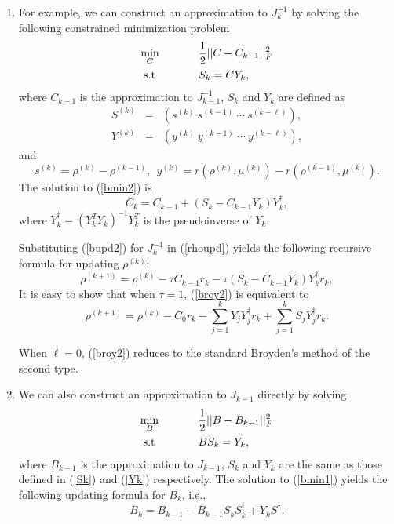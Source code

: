 \documentclass[11pt]{book}
\newcommand{\rhok}{\rho^{(k)}}
\begin{document}
\begin{enumerate}
\item For example, we can construct an approximation to $J_k^{-1}$ by solving 
the following constrained minimization problem
\begin{align}
\min_{C}  \hspace{.5in} &\frac{1}{2}||C - C_{k-1}||^2_F \nonumber \\
\text{s.t } \hspace{.5in} & S_k = CY_k, \label{bmin2}
\end{align}
where $C_{k-1}$ is the approximation to $J^{-1}_{k-1}$, $S_k$ and 
$Y_k$ are defined as 
\begin{eqnarray}
S^{(k)} &=& ( s^{(k)}\: s^{(k-1)} \: \cdots \: s^{(k-\ell)} ), \label{Sk}\\
Y^{(k)} &=& ( y^{(k)}\: y^{(k-1)} \: \cdots \: y^{(k-\ell)} ), \label{Yk}
\end{eqnarray}
and
\begin{equation}
s^{(k)} = \rho^{(k)} - \rho^{(k-1)}, \ \ 
y^{(k)} = r(\rho^{(k)},\mu^{(k)}) - r(\rho^{(k-1)},\mu^{(k)}). 
\label{syk}
\end{equation}
The solution to (\ref{bmin2}) is
\begin{equation}
C_k = C_{k-1} + (S_k-C_{k-1}Y_k)Y_k^{\dagger},
\label{bupd2}
\end{equation}
where $Y_k^{\dagger} = (Y_k^TY_k)^{-1}Y_k^T$ is the pseudoinverse of $Y_k$.

Substituting (\ref{bupd2}) for $J_{k}^{-1}$ in (\ref{rhoupd}) 
yields the following recursive formula for updating $\rhok$:
\begin{equation}
\rho^{(k+1)} = \rhok - \tau C_{k-1}r_k - \tau 
(S_k - C_{k-1}Y_k)Y_k^{\dagger}r_k,
\label{broy2}
\end{equation}
It is easy to show that when $\tau = 1$, (\ref{broy2}) is equivalent to
\[
\rho^{(k+1)} = \rhok
- C_0 r_k - \sum_{j = 1}^k Y_jY_j^{\dagger} r_k + \sum_{j=1}^k S_j Y_j^{\dagger} r_k.
\]

When $\ell=0$, (\ref{broy2}) reduces to the standard Broyden's method of the 
second type. 


\item
We can also construct an approximation to $J_{k-1}$ directly by solving 
\begin{align}
\min_{B}  \hspace{.5in} &\frac{1}{2}||B - B_{k-1}||^2_F \nonumber \\
\text{s.t } \hspace{.5in} & BS_k = Y_k, \label{bmin1}
\end{align}
where $B_{k-1}$ is the approximation to $J_{k-1}$, $S_k$ and $Y_k$
are the same as those defined in (\ref{Sk}) and (\ref{Yk}) respectively.  
The solution to (\ref{bmin1}) yields the following updating formula for $B_k$, 
i.e.,
\begin{equation}
B_k  = B_{k-1} - B_{k-1}S_k S_k^{\dagger} + Y_k S^{\dagger}.
\end{equation}


\end{enumerate}
\end{document}

